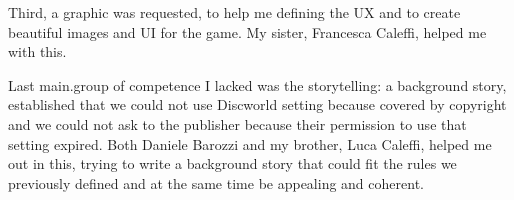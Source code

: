 		Third, a graphic was requested, to help me defining the UX and to create beautiful images and UI for the game. My sister, Francesca Caleffi, helped me with this.
		
		Last main.group of competence I lacked was the storytelling: a background story, established that we could not use Discworld setting because covered by copyright and we could not ask to the publisher because their permission to use that setting expired. Both Daniele Barozzi and my brother, Luca Caleffi, helped me out in this, trying to write a background story that could fit the rules we previously defined and at the same time be appealing and coherent.